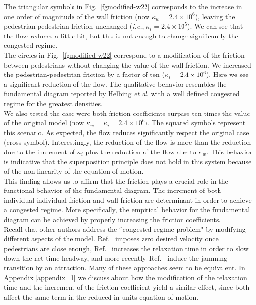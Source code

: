 The triangular symbols in Fig.~\ref{fgmodified-w22} corresponds to the increase in one order of magnitude of the wall friction (now $\kappa_w = 2.4\times10^{6}$), leaving the pedestrian-pedestrian friction unchanged (\textit{i.e.}, $\kappa_i = 2.4\times10^{5}$). We can see that the flow reduces a little bit, but this is not enough to change significantly the congested regime. \\

The circles in Fig.~\ref{fgmodified-w22} correspond to a modification of the friction between pedestrians without changing the value of the wall friction. We increased the pedestrian-pedestrian friction by a factor of ten ($\kappa_i = 2.4\times10^{6}$). Here we see a significant reduction of the flow. The qualitative behavior resembles the fundamental diagram reported by Helbing \textit{et al}. with a well defined congested regime for the greatest densities.\\

We also tested the case were both friction coefficients surpass ten times the value of the original model (now $\kappa_w = \kappa_i = 2.4\times10^{6}$). The squared symbols represent this scenario. As expected, the flow reduces significantly respect the original case (cross symbol). Interestingly, the reduction of the flow is more than the reduction due to the increment of $\kappa_i$ plus the reduction of the flow due to $\kappa_w$. This behavior is indicative that the superposition principle does not hold in this system because of the non-linearity of the equation of motion.   \\

This finding allows us to affirm that the friction plays a crucial role in the functional behavior of the fundamental diagram. The increment of both individual-individual friction and wall friction are determinant in order to achieve a congested regime. More specifically, the empirical behavior for the fundamental diagram can be achieved by properly increasing the friction coefficients.\\

Recall that other authors address the ``congested regime problem" by modifying different aspects of the model. Ref.~\cite{parisi2} imposes zero desired velocity once pedestrians are close enough, Ref.~\cite{johansson} increases the relaxation time in order to slow down the net-time headway, and more recently,  Ref.~\cite{kwak} induce the jamming transition by an attraction. Many of these approaches seem to be equivalent. In Appendix \ref{appendix_1} we discuss about how the modification of the relaxation time and the increment of the friction coefficient yield a similar effect, since both affect the same term in the reduced-in-units equation of motion. \\

